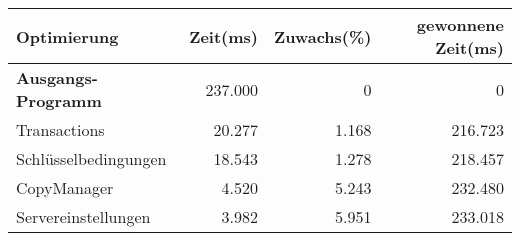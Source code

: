 \setlength{\extrarowheight}{2pt}

\begin{tabular}{l|rrr}
\rowcolor{heading}
\color{white}\textbf{Optimierung} &
\color{white}\textbf{Zeit(ms)} &
\color{white}\textbf{Zuwachs(\%)} &
\color{white}\textbf{gewonnene Zeit(ms)}\\
\hline
\textbf{Ausgangs-Programm} & 237.000 & 0 & 0\\

Transactions & 20.277 & 1.168 & 216.723\\
Schlüsselbedingungen & 18.543 & 1.278 & 218.457\\
CopyManager & 4.520 & 5.243 & 232.480\\
Servereinstellungen & 3.982 & 5.951 & 233.018\\

\hline
\end{tabular}
